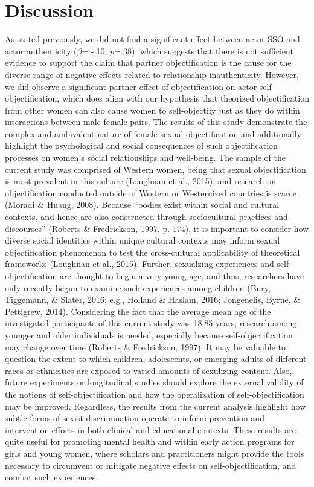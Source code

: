 \documentclass[man]{apa6}
\begin{document}
\section{Discussion}\label{discussion}

As stated previously, we did not find a significant effect between actor
SSO and actor authenticity (\(\beta\)= -.10, \(p\)=.38), which suggests
that there is not sufficient evidence to support the claim that partner
objectification is the cause for the diverse range of negative effects
related to relationship inauthenticity. However, we did observe a
significant partner effect of objectification on actor
self-objectification, which does align with our hypothesis that
theorized objectification from other women can also cause women to
self-objectify just as they do within interactions between male-female
pairs. The results of this study demonstrate the complex and ambivalent
nature of female sexual objectification and additionally highlight the
psychological and social consequences of such objectification processes
on women's social relationships and well-being. The sample of the
current study was comprised of Western women, being that sexual
objectification is most prevalent in this culture (Loughnan et al.,
2015), and research on objectification conducted outside of Western or
Westernized countries is scarce (Moradi \& Huang, 2008). Because
\enquote{bodies exist within social and cultural contexts, and hence are
also constructed through sociocultural practices and discourses}
(Roberts \& Fredrickson, 1997, p. 174), it is important to consider how
diverse social identities within unique cultural contexts may inform
sexual objectification phenomenon to test the cross-cultural
applicability of theoretical frameworks (Loughnan et al., 2015).
Further, sexualzing experiences and self-objectification are thought to
begin a very young age, and thus, researchers have only recently begun
to examine such experiences among children (Bury, Tiggemann, \& Slater,
2016; e.g., Holland \& Haslam, 2016; Jongenelis, Byrne, \& Pettigrew,
2014). Considering the fact that the average mean age of the
investigated participants of this current study was 18.85 years,
research among younger and older individuals is needed, especially
because self-objectification may change over time (Roberts \&
Fredrickson, 1997). It may be valuable to question the extent to which
children, adolescents, or emerging adults of different races or
ethnicities are exposed to varied amounts of sexulizing content. Also,
future experiments or longitudinal studies should explore the external
validity of the notions of self-objectification and how the
operalization of self-objectification may be improved. Regardless, the
results from the current analysis highlight how subtle forms of sexist
discrimination operate to inform prevention and intervention efforts in
both clinical and educational contexts. These results are quite useful
for promoting mental health and within early action programs for girls
and young women, where scholars and practitioners might provide the
tools necessary to circumvent or mitigate negative effects on
self-objectification, and combat such experiences.
\end{document}

